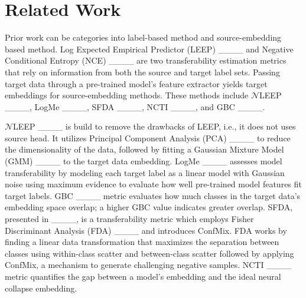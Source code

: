 \section{Related Work}

Prior work can be categories into label-based method and source-embedding based method. Log Expected Empirical Predictor (LEEP) ____ and Negative Conditional Entropy (NCE) ____ are two transferability estimation metrics that rely on information from both the source and target label sets. %
Passing target data through a pre-trained model's feature extractor yields target embeddings for source-embedding methods. These methods include $\mathcal{N}$LEEP ____, LogMe ____, SFDA ____, NCTI ____, and GBC ____.


$\mathcal{N}$LEEP ____ is build to remove the drawbacks of LEEP, i.e., it does not uses source head. It utilizes Principal Component Analysis (PCA) ____ to reduce the dimensionality of the data, followed by fitting a Gaussian Mixture Model (GMM) ____ to the target data embedding. LogMe ____ assesses model transferability by modeling each target label as a linear model with Gaussian noise using maximum evidence to evaluate how well pre-trained model features fit target labels. GBC ____ metric evaluates how much classes in the target data's embedding space overlap; a higher GBC value indicates greater overlap. SFDA, presented in ____, is a transferability metric which employs Fisher Discriminant Analysis (FDA) ____ and introduces ConfMix. FDA works by finding a linear data transformation that maximizes the separation between classes using within-class scatter and between-class scatter followed by applying ConfMix, a mechanism to generate challenging negative samples. NCTI ____ metric quantifies the gap between a model's embedding and the ideal neural collapse embedding. 


